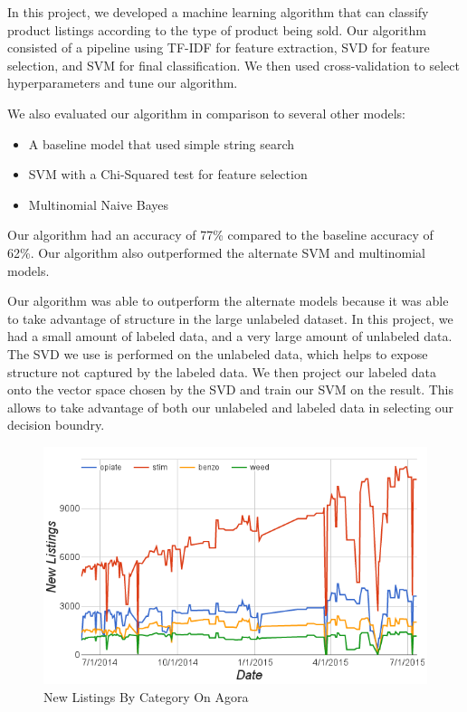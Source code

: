 In this project, we developed a machine learning algorithm that can classify product listings according to the type of product being sold.
Our algorithm consisted of a pipeline using TF-IDF for feature extraction, SVD for feature selection, and SVM for final classification.
We then used cross-validation to select hyperparameters and tune our algorithm.

We also evaluated our algorithm in comparison to several other models:
\begin{itemize}
    \item{A baseline model that used simple string search}
    \item{SVM with a Chi-Squared test for feature selection}
    \item{Multinomial Naive Bayes}
\end{itemize}

Our algorithm had an accuracy of 77\% compared to the baseline accuracy of 62\%.
Our algorithm also outperformed the alternate SVM and multinomial models.

Our algorithm was able to outperform the alternate models because it was able to take advantage of structure in the large unlabeled dataset.
In this project, we had a small amount of labeled data, and a very large amount of unlabeled data.
The SVD we use is performed on the unlabeled data, which helps to expose structure not captured by the labeled data.
We then project our labeled data onto the vector space chosen by the SVD and train our SVM on the result.
This allows to take advantage of both our unlabeled and labeled data in selecting our decision boundry.

\begin{figure}[htbp]
    \includegraphics[width=\linewidth]{plots/new_categories_graph}
    \caption{New Listings By Category On Agora}
\end{figure}

